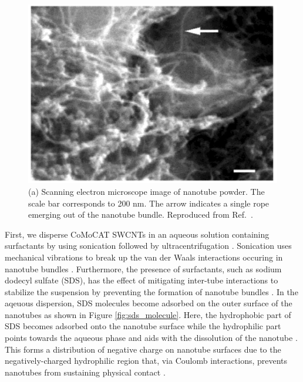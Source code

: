 \begin{figure}[h]
	\centering
	\includegraphics[scale=0.3]{images/chapter_methods/sem_cnt_powder_bandy}
	\caption{(a) Scanning electron microscope image of nanotube powder. The scale bar corresponds to 200 nm. The arrow indicates a single rope emerging out of the nanotube bundle. Reproduced from Ref.\ \cite{bandyopadhyaya2002stabilization}.}
\end{figure}


First, we disperse CoMoCAT SWCNTs in an aqueous solution containing surfactants by using sonication followed by ultracentrifugation \cite{ichinose2017extraction}. Sonication uses mechanical vibrations to break up the van der Waals interactions occuring in nanotube bundles \cite{tkalya2012use}. Furthermore, the presence of surfactants, such as sodium dodecyl sulfate (SDS), has the effect of mitigating inter-tube interactions to stabilize the suspension by preventing the formation of nanotube bundles \cite{vaisman2006role}. In the aqeuous dispersion, SDS molecules become adsorbed on the outer surface of the nanotubes as shown in Figure \ref{fig:sds_molecule}. Here, the hydrophobic part of SDS becomes adsorbed onto the nanotube surface while the hydrophilic part points towards the aqueous phase and aids with the dissolution of the nanotube \cite{richard2003supramolecular}. This forms a distribution of negative charge on nanotube surfaces due to the negatively-charged hydrophilic region that, via Coulomb interactions, prevents nanotubes from sustaining physical contact \cite{richard2003supramolecular}. 

